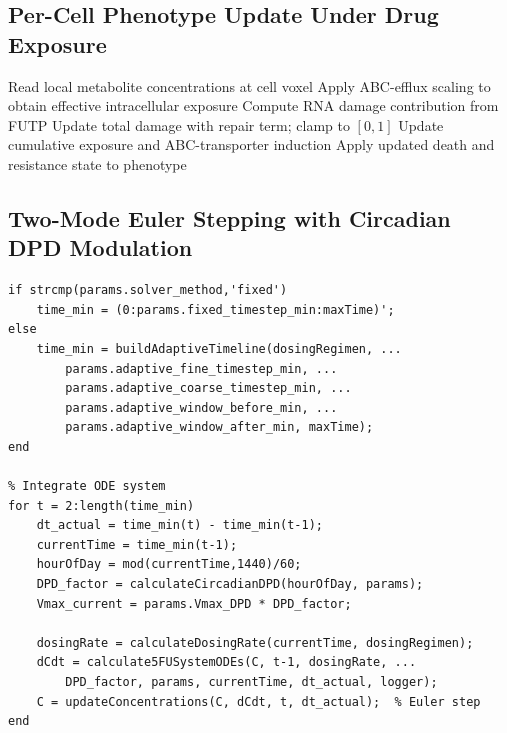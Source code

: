 \subsection{Per-Cell Phenotype Update Under Drug Exposure}
\begin{algorithm}[H]
\caption{Per-cell drug response with S-phase sensitivity and apoptosis update}
\label{alg:appendix-phenotype-update}
\DontPrintSemicolon
{}
Read local metabolite concentrations at cell voxel\;
Apply ABC-efflux scaling to obtain effective intracellular exposure\;
Compute RNA damage contribution from FUTP\;
Update total damage with repair term; clamp to $[0,1]$\;
Update cumulative exposure and ABC-transporter induction\;
Apply updated death and resistance state to phenotype\;
\end{algorithm}

\subsection{Two-Mode Euler Stepping with Circadian DPD Modulation}
\begin{lstlisting}[style=Matlab-editor,caption={Fixed/adaptive Euler stepping with circadian Vmax scaling},label={lst:appendix-two-mode-euler}]
% Build timeline
if strcmp(params.solver_method,'fixed')
    time_min = (0:params.fixed_timestep_min:maxTime)';
else
    time_min = buildAdaptiveTimeline(dosingRegimen, ...
        params.adaptive_fine_timestep_min, ...
        params.adaptive_coarse_timestep_min, ...
        params.adaptive_window_before_min, ...
        params.adaptive_window_after_min, maxTime);
end

% Integrate ODE system
for t = 2:length(time_min)
    dt_actual = time_min(t) - time_min(t-1);
    currentTime = time_min(t-1);
    hourOfDay = mod(currentTime,1440)/60;
    DPD_factor = calculateCircadianDPD(hourOfDay, params);
    Vmax_current = params.Vmax_DPD * DPD_factor;

    dosingRate = calculateDosingRate(currentTime, dosingRegimen);
    dCdt = calculate5FUSystemODEs(C, t-1, dosingRate, ...
        DPD_factor, params, currentTime, dt_actual, logger);
    C = updateConcentrations(C, dCdt, t, dt_actual);  % Euler step
end
\end{lstlisting}

